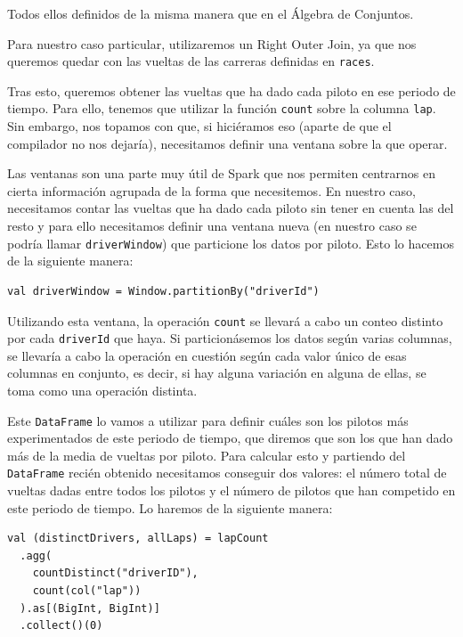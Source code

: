 \documentclass[12pt,twoside,titlepage]{report}
\begin{document}
Todos ellos definidos de la misma manera que en el Álgebra de Conjuntos.

Para nuestro caso particular, utilizaremos un Right Outer Join, ya que nos queremos quedar con las vueltas de las carreras definidas en \texttt{races}.

Tras esto, queremos obtener las vueltas que ha dado cada piloto en ese periodo de tiempo. Para ello, tenemos que utilizar la función \texttt{count} sobre la columna \texttt{lap}. Sin embargo, nos topamos con que, si hiciéramos eso (aparte de que el compilador no nos dejaría), necesitamos definir una ventana sobre la que operar.

Las ventanas son una parte muy útil de Spark que nos permiten centrarnos en cierta información agrupada de la forma que necesitemos. En nuestro caso, necesitamos contar las vueltas que ha dado cada piloto sin tener en cuenta las del resto y para ello necesitamos definir una ventana nueva (en nuestro caso se podría llamar \texttt{driverWindow}) que particione los datos por piloto. Esto lo hacemos de la siguiente manera:

\begin{lstlisting}
val driverWindow = Window.partitionBy("driverId") 
\end{lstlisting}

Utilizando esta ventana, la operación \texttt{count} se llevará a cabo un conteo distinto por cada \texttt{driverId} que haya. Si particionásemos los datos según varias columnas, se llevaría a cabo la operación en cuestión según cada valor único de esas columnas en conjunto, es decir, si hay alguna variación en alguna de ellas, se toma como una operación distinta.

Este \texttt{DataFrame} lo vamos a utilizar para definir cuáles son los pilotos más experimentados de este periodo de tiempo, que diremos que son los que han dado más de la media de vueltas por piloto. Para calcular esto y partiendo del \texttt{DataFrame} recién obtenido necesitamos conseguir dos valores: el número total de vueltas dadas entre todos los pilotos y el número de pilotos que han competido en este periodo de tiempo. Lo haremos de la siguiente manera:

\begin{lstlisting}
val (distinctDrivers, allLaps) = lapCount
  .agg(
    countDistinct("driverID"),
    count(col("lap"))
  ).as[(BigInt, BigInt)]
  .collect()(0)
\end{lstlisting}
\end{document}
